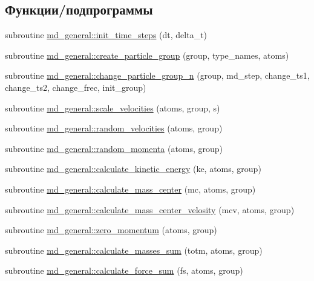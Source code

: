 \subsection*{Функции/подпрограммы}
\begin{DoxyCompactItemize}
\item 
subroutine \mbox{\hyperlink{namespacemd__general_a3a69c40fe5a6e7938d398f803b21e474}{md\+\_\+general\+::init\+\_\+time\+\_\+steps}} (dt, delta\+\_\+t)
\item 
subroutine \mbox{\hyperlink{namespacemd__general_a6e847bdd3b7115bf5ff69e8cd8e68d7f}{md\+\_\+general\+::create\+\_\+particle\+\_\+group}} (group, type\+\_\+names, atoms)
\item 
subroutine \mbox{\hyperlink{namespacemd__general_a5614c27d83ed003aa01d3be2f1b45c57}{md\+\_\+general\+::change\+\_\+particle\+\_\+group\+\_\+n}} (group, md\+\_\+step, change\+\_\+ts1, change\+\_\+ts2, change\+\_\+frec, init\+\_\+group)
\item 
subroutine \mbox{\hyperlink{namespacemd__general_ad4ad26fa9584c63f846d49033ce92987}{md\+\_\+general\+::scale\+\_\+velocities}} (atoms, group, s)
\item 
subroutine \mbox{\hyperlink{namespacemd__general_a326a2fe1c1da84197c4566801133648a}{md\+\_\+general\+::random\+\_\+velocities}} (atoms, group)
\item 
subroutine \mbox{\hyperlink{namespacemd__general_a8192b37ec3462b5fcb7fabf17c8eb658}{md\+\_\+general\+::random\+\_\+momenta}} (atoms, group)
\item 
subroutine \mbox{\hyperlink{namespacemd__general_a0949b9217f73c42e2c7ea47a4e559e39}{md\+\_\+general\+::calculate\+\_\+kinetic\+\_\+energy}} (ke, atoms, group)
\item 
subroutine \mbox{\hyperlink{namespacemd__general_aafe7eb801a25cbfeff68d5574b9fc152}{md\+\_\+general\+::calculate\+\_\+mass\+\_\+center}} (mc, atoms, group)
\item 
subroutine \mbox{\hyperlink{namespacemd__general_a39191e16e77e39d5486e4daaeaa2522e}{md\+\_\+general\+::calculate\+\_\+mass\+\_\+center\+\_\+velosity}} (mcv, atoms, group)
\item 
subroutine \mbox{\hyperlink{namespacemd__general_a79ea9e512a27c651278559e30f97a336}{md\+\_\+general\+::zero\+\_\+momentum}} (atoms, group)
\item 
subroutine \mbox{\hyperlink{namespacemd__general_a77b50b971bc4812a1299348a398491e0}{md\+\_\+general\+::calculate\+\_\+masses\+\_\+sum}} (totm, atoms, group)
\item 
subroutine \mbox{\hyperlink{namespacemd__general_ac5733857b75ce71aa32a105751e4dfd5}{md\+\_\+general\+::calculate\+\_\+force\+\_\+sum}} (fs, atoms, group)

\end{DoxyCompactItemize}
